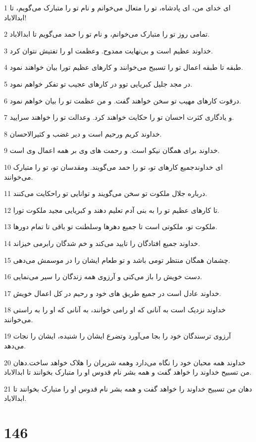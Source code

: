 \par 1 ای خدای من، ای پادشاه، تو را متعال می‌خوانم و نام تو را متبارک می‌گویم، تا ابدالاباد!
\par 2 تمامی روز تو را متبارک می‌خوانم، و نام تو را حمد می‌گویم تا ابدالاباد.
\par 3 خداوند عظیم است و بی‌نهایت ممدوح. وعظمت او را تفتیش نتوان کرد.
\par 4 طبقه تا طبقه اعمال تو را تسبیح می‌خوانند و کارهای عظیم تورا بیان خواهند نمود.
\par 5 در مجد جلیل کبریایی توو در کارهای عجیب تو تفکر خواهم نمود.
\par 6 درقوت کارهای مهیب تو سخن خواهند گفت. و من عظمت تو را بیان خواهم نمود.
\par 7 و یادگاری کثرت احسان تو را حکایت خواهند کرد. وعدالت تو را خواهند سرایید.
\par 8 خداوند کریم ورحیم است و دیر غضب و کثیرالاحسان.
\par 9 خداوند برای همگان نیکو است. و رحمت های وی بر همه اعمال وی است.
\par 10 ‌ای خداوندجمیع کارهای تو، تو را حمد می‌گویند. ومقدسان تو، تو را متبارک می‌خوانند.
\par 11 درباره جلال ملکوت تو سخن می‌گویند و توانایی تو راحکایت می‌کنند.
\par 12 تا کارهای عظیم تو را به بنی آدم تعلیم دهند و کبریایی مجید ملکوت تورا.
\par 13 ملکوت تو، ملکوتی است تا جمیع دهرها وسلطنت تو باقی تا تمام دورها.
\par 14 خداوند جمیع افتادگان را تایید می‌کند و خم شدگان رابرمی خیزاند.
\par 15 چشمان همگان منتظر تومی باشد و تو طعام ایشان را در موسمش می‌دهی.
\par 16 دست خویش را باز می‌کنی و آرزوی همه زندگان را سیر می‌نمایی.
\par 17 خداوند عادل است در جمیع طریق های خود و رحیم در کل اعمال خویش.
\par 18 خداوند نزدیک است به آنانی که او رامی خوانند، به آنانی که او را به راستی می‌خوانند.
\par 19 آرزوی ترسندگان خود را بجا می‌آورد وتضرع ایشان را شنیده، ایشان را نجات می‌دهد.
\par 20 خداوند همه محبان خود را نگاه می‌دارد وهمه شریران را هلاک خواهد ساخت.دهان من تسبیح خداوند را خواهد گفت و همه بشر نام قدوس او را متبارک بخوانند تا ابدالاباد.
\par 21 دهان من تسبیح خداوند را خواهد گفت و همه بشر نام قدوس او را متبارک بخوانند تا ابدالاباد.
 
\chapter{146}


